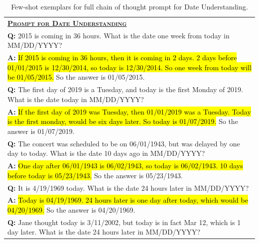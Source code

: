 \begingroup
\begin{table}[H]
    \caption{    
    Few-shot exemplars for full chain of thought prompt for Date Understanding.
    }
    \centering
    \small
    \begin{tabular}{p{\linewidth}}
        \toprule
        \underline{\textbf{\textsc{Prompt for Date Understanding}}} \\
        \vspace{-2mm}
        \textbf{Q:} 2015 is coming in 36 hours. What is the date one week from today in MM/DD/YYYY? \\
        \vspace{-1mm}
        \textbf{A:} \hl{If 2015 is coming in 36 hours, then it is coming in 2 days. 2 days before 01/01/2015 is 12/30/2014, so today is 12/30/2014. So one week from today will be 01/05/2015.} So the answer is 01/05/2015. \\
        \vspace{0mm}
        \textbf{Q:} The first day of 2019 is a Tuesday, and today is the first Monday of 2019. What is the date today in MM/DD/YYYY? \\
        \vspace{-1mm}
        \textbf{A:} \hl{If the first day of 2019 was Tuesday, then 01/01/2019 was a Tuesday. Today is the first monday, would be six days later. So today is 01/07/2019.}  So the answer is 01/07/2019.\\
        \vspace{0mm}
        \textbf{Q:}  The concert was scheduled to be on 06/01/1943, but was delayed by one day to today. What is the date 10 days ago in MM/DD/YYYY? \\
        \vspace{-1mm}
        \textbf{A:} \hl{One day after 06/01/1943 is 06/02/1943, so today is 06/02/1943. 10 days before today is 05/23/1943.} So the answer is 05/23/1943. \\
        \vspace{0mm}
        \textbf{Q:} It is 4/19/1969 today. What is the date 24 hours later in MM/DD/YYYY? \\
        \vspace{-1mm}
        \textbf{A:} \hl{Today is 04/19/1969. 24 hours later is one day after today, which would be 04/20/1969.} So the answer is 04/20/1969. \\
        \vspace{0mm}
        \textbf{Q:} Jane thought today is 3/11/2002, but today is in fact Mar 12, which is 1 day later. What is the date 24 hours later in MM/DD/YYYY? \\

\end{tabular}
\end{table}
